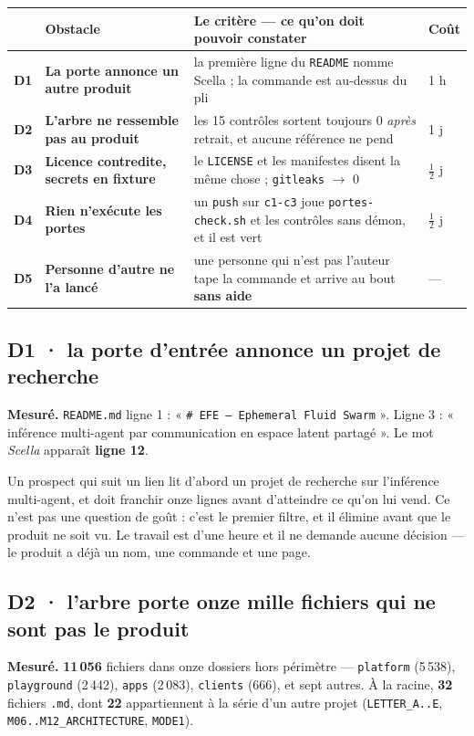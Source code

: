 \documentclass[11pt]{article}
\newcommand{\code}[1]{\texttt{\small #1}}
\newcommand{\best}[1]{{\color{efesolve}\textbf{#1}}}
\newcommand{\pire}[1]{{\color{efered}\textbf{#1}}}
\newcommand{\mm}[1]{\textbf{#1}}
\newcommand{\sz}[1]{{\small #1}}
\newcommand{\mesure}[1]{{\color{efeteal}\textbf{Mesuré.} }#1\par}
\newcommand{\fl}{$\rightarrow$}
\begin{document}
\begin{center}\small
\renewcommand{\arraystretch}{1.3}
\begin{tabular}{@{}>{\raggedright\arraybackslash}p{0.8cm} >{\raggedright\arraybackslash}p{4.2cm} >{\raggedright\arraybackslash}p{8.5cm} >{\raggedright\arraybackslash}p{2.0cm}@{}}
\toprule
& \textbf{Obstacle} & \textbf{Le critère --- ce qu'on doit pouvoir constater} & \textbf{Coût} \\
\midrule
\mm{D1} & \textbf{La porte annonce un autre produit} & la première ligne du \code{README} nomme
Scella ; la commande est au-dessus du pli & \sz{1 h} \\
\mm{D2} & \textbf{L'arbre ne ressemble pas au produit} & les 15 contrôles sortent toujours 0
\emph{après} retrait, et aucune référence ne pend & \sz{1 j} \\
\mm{D3} & \textbf{Licence contredite, secrets en fixture} & le \code{LICENSE} et les manifestes
disent la même chose ; \code{gitleaks} \fl{} 0 & \sz{$\frac{1}{2}$ j} \\
\mm{D4} & \textbf{Rien n'exécute les portes} & un \code{push} sur \code{c1-c3} joue
\code{portes-check.sh} et les contrôles sans démon, et il est vert & \sz{$\frac{1}{2}$ j} \\
\mm{D5} & \textbf{Personne d'autre ne l'a lancé} & une personne qui n'est pas l'auteur tape la
commande et arrive au bout \textbf{sans aide} & \sz{---} \\
\bottomrule
\end{tabular}
\end{center}

\subsection{\mm{D1} · la porte d'entrée annonce un projet de recherche}
\mesure{\code{README.md} ligne 1 : « \code{\# EFE --- Ephemeral Fluid Swarm} ». Ligne 3 :
« inférence multi-agent par communication en espace latent partagé ». Le mot \emph{Scella}
apparaît \pire{ligne 12}.}

Un prospect qui suit un lien lit d'abord un projet de recherche sur l'inférence multi-agent, et
doit franchir onze lignes avant d'atteindre ce qu'on lui vend. Ce n'est pas une question de goût :
c'est le premier filtre, et il élimine avant que le produit ne soit vu. Le travail est d'une
heure et il ne demande aucune décision --- le produit a déjà un nom, une commande et une page.

\subsection{\mm{D2} · l'arbre porte onze mille fichiers qui ne sont pas le produit}
\mesure{\best{11\,056} fichiers dans onze dossiers hors périmètre --- \code{platform} (5\,538),
\code{playground} (2\,442), \code{apps} (2\,083), \code{clients} (666), et sept autres. À la
racine, \best{32} fichiers \code{.md}, dont \best{22} appartiennent à la série d'un autre projet
(\code{LETTER\_A..E}, \code{M06..M12\_ARCHITECTURE}, \code{MODE1}).}
\end{document}
